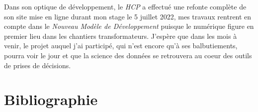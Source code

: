\documentclass[a4paper,french,12pt]{article}
\begin{document}
Dans son optique de développement, le \emph{HCP} a effectué une refonte complète de son site mise en ligne durant mon stage le 5 juillet 2022, mes travaux rentrent en compte dans le \emph{Nouveau Modèle de Développement} puisque le numérique figure en premier lieu dans les chantiers transformateurs. J'espère que dans les mois à venir, le projet auquel j'ai participé, qui n'est encore qu'à ses balbutiements, pourra voir le jour et que la science des données se retrouvera au coeur des outils de prises de décisions.

\newpage

\section{Bibliographie}
\label{sec:Bibliographie}

~\\
\end{document}
